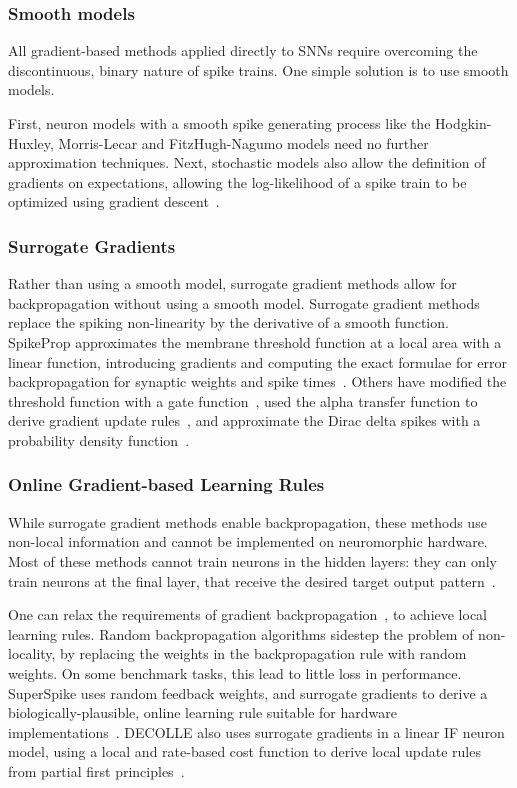 \documentclass[fyp]{socreport}
\begin{document}
\subsubsection{Smooth models}

All gradient-based methods applied directly to SNNs require overcoming the
discontinuous, binary nature of spike trains. One simple solution is to use
smooth models.

First, neuron models with a smooth spike generating process like the
Hodgkin-Huxley, Morris-Lecar and FitzHugh-Nagumo models need no further
approximation techniques. Next, stochastic models also allow the definition of
gradients on expectations, allowing the log-likelihood of a spike train to be
optimized using gradient descent~\cite{pfister06_optim_spike_timin_depen_plast}.

\subsubsection{Surrogate Gradients\label{sec:surrogate-gradients}}

Rather than using a smooth model, surrogate gradient methods allow for
backpropagation without using a smooth model. Surrogate gradient methods replace
the spiking non-linearity by the derivative of a smooth function. SpikeProp
approximates the membrane threshold function at a local area with a linear
function, introducing gradients and computing the exact formulae for error
backpropagation for synaptic weights and spike times~\cite{spikeprop}. Others
have modified the threshold function with a gate function~\cite{NIPS2018_7417},
used the alpha transfer function to derive gradient update
rules~\cite{comsa19_tempor_codin_spikin_neural_networ}, and approximate the
Dirac delta spikes with a probability density function~\cite{NIPS2018_7415}.

\subsubsection{Online Gradient-based Learning Rules}

While surrogate gradient methods enable backpropagation, these methods use
non-local information and cannot be implemented on neuromorphic hardware. Most
of these methods cannot train neurons in the hidden layers: they can only train
neurons at the final layer, that receive the desired target output
pattern~\cite{urbanczik09_gradien_learn_rule_tempot,training_deep_snn_bpp_lee}.

One can relax the requirements of gradient
backpropagation~\cite{neftci19_surrog_gradien_learn_spikin_neural_networ}, to
achieve local learning rules. Random backpropagation algorithms sidestep the
problem of non-locality, by replacing the weights in the backpropagation rule
with random weights. On some benchmark tasks, this lead to little loss in
performance. SuperSpike uses random feedback weights, and surrogate gradients to
derive a biologically-plausible, online learning rule suitable for hardware
implementations~\cite{zenke17_super}. DECOLLE also uses surrogate gradients in a
linear IF neuron model, using a local and rate-based cost function to derive
local update rules from partial first
principles~\cite{kaiser18_synap_plast_dynam_deep_contin}.
\end{document}
